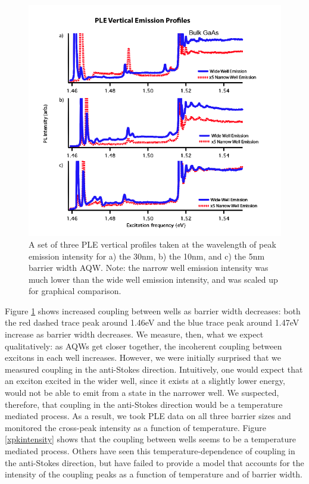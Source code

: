 \begin{figure}
\centering
\includegraphics[width = \textwidth]{vertprof.png}
\caption{ \doublespacing A set of three PLE vertical profiles taken at the wavelength of peak emission intensity for a) the 30nm, b) the 10nm, and c) the 5nm barrier width AQW. Note: the narrow well emission intensity was much lower than the wide well emission intensity, and was scaled up for graphical comparison.} 
\label{traces}
\end{figure}

\indent Figure \ref{traces} shows increased coupling between wells as barrier width decreases: both the red dashed trace peak around 1.46eV and the blue trace peak around 1.47eV increase as barrier width decreases. We measure, then, what we expect qualitatively: as AQWs get closer together, the incoherent coupling between excitons in each well increases. However, we were initially surprised that we measured coupling in the anti-Stokes direction. Intuitively, one would expect that an exciton excited in the wider well, since it exists at a slightly lower energy, would not be able to emit from a state in the narrower well. We suspected, therefore, that coupling in the anti-Stokes direction would be a temperature mediated process. As a result, we took PLE data on all three barrier sizes and monitored the cross-peak intensity as a function of temperature. Figure \ref{xpkintensity} shows that the coupling between wells seems to be a temperature mediated process. Others have seen this temperature-dependence of coupling in the anti-Stokes direction, \cite{borri} but have failed to provide a model that accounts for the intensity of the coupling peaks as a function of temperature and of barrier width.


